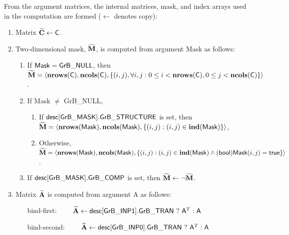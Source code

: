 From the argument matrices, the internal matrices, mask, and index arrays used in 
the computation are formed ($\leftarrow$ denotes copy):
\begin{enumerate}
    \item Matrix ${\bf \widetilde{C}} \leftarrow {\sf C}$.

    \item Two-dimensional mask, ${\bf \widetilde{M}}$, is computed from 
    argument {\sf Mask} as follows:
    \begin{enumerate}
        \item If ${\sf Mask} = {\sf GrB\_NULL}$, then ${\bf \widetilde{M}} = 
        \langle \bold{nrows}({\sf C}), \bold{ncols}({\sf C}), \{(i,j), 
        \forall i,j : 0 \leq i <  \bold{nrows}({\sf C}), 0 \leq j < 
        \bold{ncols}({\sf C}) \} \rangle$.

        \item If {\sf Mask} $\ne$ {\sf GrB\_NULL},
        \begin{enumerate}
            \item If ${\sf desc[GrB\_MASK].GrB\_STRUCTURE}$ is set, then 
            ${\bf \widetilde{M}} = \langle \bold{nrows}({\sf Mask}), 
            \bold{ncols}({\sf Mask}), \{(i,j) : (i,j) \in \bold{ind}({\sf Mask}) \} \rangle$,
            \item Otherwise, ${\bf \widetilde{M}} = \langle \bold{nrows}({\sf Mask}), 
            \bold{ncols}({\sf Mask}), \\ \{(i,j) : (i,j) \in \bold{ind}({\sf Mask}) \wedge 
            ({\sf bool}){\sf Mask}(i,j) = {\sf true}\} \rangle$.
        \end{enumerate}

        \item    If ${\sf desc[GrB\_MASK].GrB\_COMP}$ is set, then 
        ${\bf \widetilde{M}} \leftarrow \neg {\bf \widetilde{M}}$.
    \end{enumerate}

    \item Matrix ${\bf \widetilde{A}}$ is computed from argument {\sf A} as 
    follows: 
    \begin{itemize}[leftmargin=1.2in]
    \item[bind-first:~~~~]  ${\bf \widetilde{A}}\leftarrow
        {\sf desc[GrB\_INP1].GrB\_TRAN} \ ? \ {\sf A}^T : {\sf A}$
    \item[bind-second:~~~~] ${\bf \widetilde{A}}\leftarrow
        {\sf desc[GrB\_INP0].GrB\_TRAN} \ ? \ {\sf A}^T : {\sf A}$
    \end{itemize}
\end{enumerate}

